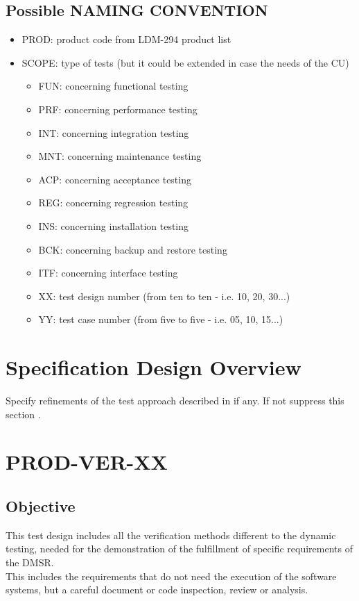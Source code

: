 \documentclass[DM,lsstdraft,STS,toc]{lsstdoc}
\def\product{PROD}
\begin{document}
\subsection{ Possible  NAMING CONVENTION}
\begin{itemize}
	\item PROD: product code from LDM-294 product list
	\item SCOPE: type of tests (but it could be extended in case the needs of the CU)
\begin{itemize}
	\item	FUN: concerning functional testing
	\item	PRF: concerning performance testing
	\item	INT: concerning integration testing
	\item	MNT: concerning maintenance testing
	\item 	ACP: concerning acceptance testing
	\item	REG: concerning regression testing
	\item	INS: concerning installation testing
	\item	BCK: concerning backup and restore testing
	\item	ITF: concerning interface testing
	\item XX: test design number (from ten to ten - i.e. 10, 20, 30...)
	\item YY: test case number (from five to five - i.e. 05, 10, 15...)
\end{itemize}
\end{itemize}


\section{Specification Design Overview \label{sect:design}}
Specify refinements of the test approach described in  if any.
If not suppress this section .

\section{\product-VER-XX \label{sect:designid_verification}}

\subsection{Objective \label{sect:designobj}}
This test design includes all the verification methods different to the dynamic testing, needed for the
demonstration of the fulfillment of specific requirements of the DMSR.\\
This includes  the requirements that do not need the execution of the software systems, but a careful document or code inspection, review
or analysis.
\end{document}
